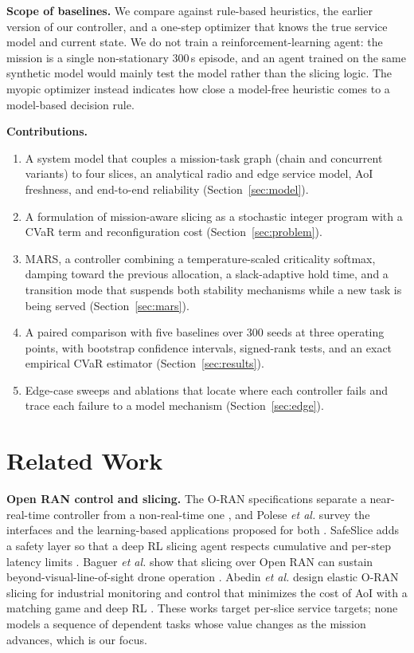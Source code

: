 \documentclass[conference]{IEEEtran}
\begin{document}
\textbf{Scope of baselines.} We compare against rule-based heuristics, the earlier version of our controller, and a one-step optimizer that knows the true service model and current state. We do not train a reinforcement-learning agent: the mission is a single non-stationary 300\,s episode, and an agent trained on the same synthetic model would mainly test the model rather than the slicing logic. The myopic optimizer instead indicates how close a model-free heuristic comes to a model-based decision rule.

\textbf{Contributions.}
\begin{enumerate}
\item A system model that couples a mission-task graph (chain and concurrent variants) to four slices, an analytical radio and edge service model, AoI freshness, and end-to-end reliability (Section~\ref{sec:model}).
\item A formulation of mission-aware slicing as a stochastic integer program with a CVaR term and reconfiguration cost (Section~\ref{sec:problem}).
\item MARS, a controller combining a temperature-scaled criticality softmax, damping toward the previous allocation, a slack-adaptive hold time, and a transition mode that suspends both stability mechanisms while a new task is being served (Section~\ref{sec:mars}).
\item A paired comparison with five baselines over 300 seeds at three operating points, with bootstrap confidence intervals, signed-rank tests, and an exact empirical CVaR estimator (Section~\ref{sec:results}).
\item Edge-case sweeps and ablations that locate where each controller fails and trace each failure to a model mechanism (Section~\ref{sec:edge}).
\end{enumerate}

\section{Related Work}
\textbf{Open RAN control and slicing.} The O-RAN specifications separate a near-real-time controller from a non-real-time one \cite{oranarch,oranwg3}, and Polese \emph{et al.} survey the interfaces and the learning-based applications proposed for both \cite{polese}. SafeSlice adds a safety layer so that a deep RL slicing agent respects cumulative and per-step latency limits \cite{safeslice}. Baguer \emph{et al.} show that slicing over Open RAN can sustain beyond-visual-line-of-sight drone operation \cite{bvlos}. Abedin \emph{et al.} design elastic O-RAN slicing for industrial monitoring and control that minimizes the cost of AoI with a matching game and deep RL \cite{abedin}. These works target per-slice service targets; none models a sequence of dependent tasks whose value changes as the mission advances, which is our focus.
\end{document}
